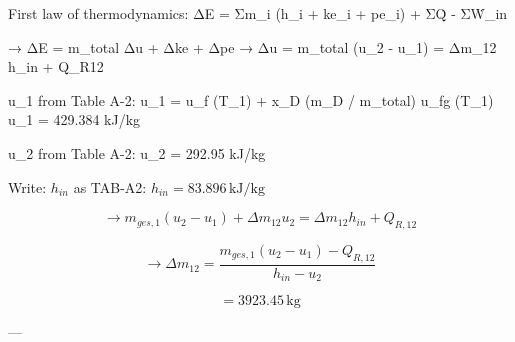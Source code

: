 First law of thermodynamics:  
ΔE = Σm_i (h_i + ke_i + pe_i) + ΣQ̇ - ΣẆ_in  

→ ΔE = m_total Δu + Δke + Δpe  
→ Δu = m_total (u_2 - u_1) = Δm_12 h_in + Q_R12  

u_1 from Table A-2: u_1 = u_f (T_1) + x_D (m_D / m_total) u_fg (T_1)  
u_1 = 429.384 kJ/kg  

u_2 from Table A-2: u_2 = 292.95 kJ/kg

Write: \( h_{in} \) as TAB-A2: \( h_{in} = 83.896 \, \text{kJ/kg} \)  

\[
\rightarrow m_{ges,1} (u_2 - u_1) + \Delta m_{12} u_2 = \Delta m_{12} h_{in} + Q_{R,12}
\]  

\[
\rightarrow \Delta m_{12} = \frac{m_{ges,1} (u_2 - u_1) - Q_{R,12}}{h_{in} - u_2}
\]  

\[
= 3923.45 \, \text{kg}
\]  

---